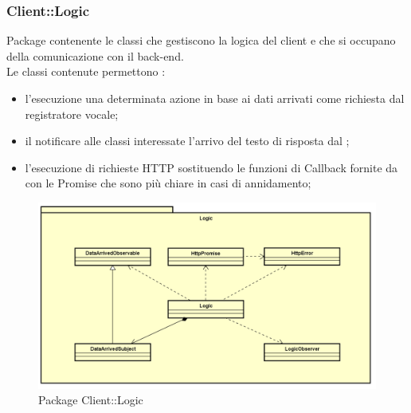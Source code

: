 \subsubsection{Client::Logic}
Package contenente le classi che gestiscono la logica del client e che si occupano della comunicazione con il back-end.\\
Le classi contenute permettono :
\begin{itemize}
\item l'esecuzione una determinata azione in base ai dati arrivati come richiesta dal registratore vocale;
\item il notificare alle classi interessate l'arrivo del testo di risposta dal ;
\item l'esecuzione di richieste HTTP sostituendo le funzioni di Callback fornite da  con le Promise che sono più chiare in casi di annidamento;
\end{itemize}
\begin{figure}[h] \centering \includegraphics[width=\textwidth,height=\textheight,keepaspectratio]{images/diagrams/client/Client/Logic.png}
	\caption{Package Client::Logic}
\end{figure}

